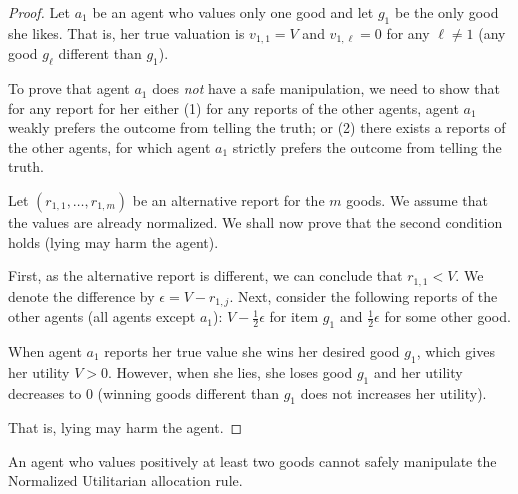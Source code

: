 \begin{proof}
    Let $a_1$ be an agent who values only one good and let $g_1$ be the only good she likes. That is, her true valuation is $v_{1,1} = V$ and $v_{1,\ell} = 0$ for any $\ell \neq 1$ (any good $g_{\ell}$ different than $g_1$).
    
    To prove that agent $a_1$ does \emph{not} have a safe manipulation, we need to show that for any report for her either (1) for any reports of the other agents, agent $a_1$ weakly prefers the outcome from telling the truth; or (2) there exists a reports of the other agents, for which agent $a_1$ strictly prefers the outcome from telling the truth.

    
    Let $(r_{1,1}, \ldots, r_{1,m})$ be an alternative report for the $m$ goods. We assume that the values are already normalized.
    We shall now prove that the second condition holds (lying may harm the agent). 
    
    First, as the alternative report is different, we can conclude that $r_{1,1} < V$.
    We denote the difference by $\epsilon = V - r_{1,j}$.
    Next, consider the following reports of the other agents (all agents except $a_1$): $V - \frac{1}{2}\epsilon$ for item $g_1$ and $\frac{1}{2}\epsilon$ for some other good. 
    
    When agent $a_1$ reports her true value she wins her desired good $g_1$, which gives her utility $V >0$. 
    However, when she lies, she loses good $g_1$ and her utility decreases to $0$ (winning goods different than $g_1$ does not increases her utility).
    
    That is, lying may harm the agent. 
\end{proof}


\begin{lemmarep}
\label{claim:normalized-agent-who-likes-at-least-two}
An agent who values positively at least two goods cannot safely manipulate the Normalized Utilitarian allocation rule.
\end{lemmarep}

\newcommand{\increasedInd}{\mathrm{inc}}
\newcommand{\decreasedInd}{\mathrm{dec}}

